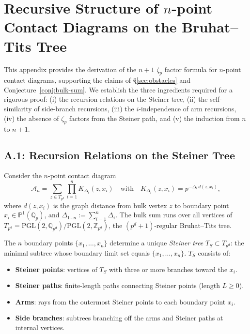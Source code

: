 \documentclass[11pt,a4paper]{article}
\newcommand{\Qp}{\mathbb{Q}_p}
\newcommand{\Pone}{\mathbb{P}^1}
\newcommand{\PGL}{\mathrm{PGL}}
\begin{document}
\appendix

\section{Recursive Structure of $n$-point Contact Diagrams on the Bruhat--Tits Tree}
\label{app:recursion}

This appendix provides the derivation of the $n{+}1$ $\zeta_p$ factor formula for $n$-point contact diagrams, supporting the claims of \S\ref{sec:obstacles} and Conjecture~\ref{conj:bulk-sum}. We establish the three ingredients required for a rigorous proof: (i) the recursion relations on the Steiner tree, (ii) the self-similarity of side-branch recursions, (iii) the $i$-independence of arm recursions, (iv) the absence of $\zeta_p$ factors from the Steiner path, and (v) the induction from $n$ to $n{+}1$.

\subsection{A.1: Recursion Relations on the Steiner Tree}

Consider the $n$-point contact diagram
\begin{equation}
\label{eq:app-bulk-sum}
\mathcal{A}_n = \sum_{z \in T_{p^d}} \prod_{i=1}^n K_{\Delta_i}(z, x_i)
\quad\text{with}\quad
K_{\Delta_i}(z, x_i) = p^{-\Delta_i \, d(z, x_i)},
\end{equation}
where $d(z, x_i)$ is the graph distance from bulk vertex $z$ to boundary point $x_i \in \Pone(\Qp)$, and $\Delta_{1\cdots n} := \sum_{i=1}^n \Delta_i$. The bulk sum runs over all vertices of $T_{p^d} = \PGL(2, \mathbb{Q}_{p^d})/\PGL(2, \mathbb{Z}_{p^d})$, the $(p^d{+}1)$-regular Bruhat--Tits tree.

The $n$ boundary points $\{x_1, \ldots, x_n\}$ determine a unique \emph{Steiner tree} $T_S \subset T_{p^d}$: the minimal subtree whose boundary limit set equals $\{x_1, \ldots, x_n\}$. $T_S$ consists of:
\begin{itemize}[leftmargin=2em]
    \item \textbf{Steiner points}: vertices of $T_S$ with three or more branches toward the $x_i$.
    \item \textbf{Steiner paths}: finite-length paths connecting Steiner points (length $L \geq 0$).
    \item \textbf{Arms}: rays from the outermost Steiner points to each boundary point $x_i$.
    \item \textbf{Side branches}: subtrees branching off the arms and Steiner paths at internal vertices.
\end{itemize}
\end{document}
